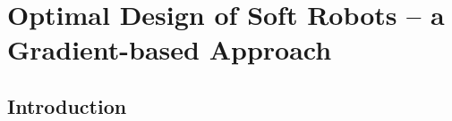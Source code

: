 \chapter[Design Optimization]{Optimal Design of Soft Robots -- a Gradient-based Approach}
\label{chap: chapter 2}




\section{Introduction} \label{sec: chap1 1_introduction}


%
